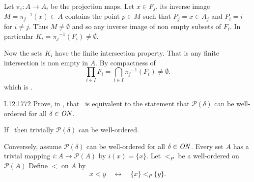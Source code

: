Let \(\pi_i: A \to A_i\) be the projection maps.
Let \(x \in F_j\), its inverse image \(M = {\pi_j}^{-1}(x) \subset A\)
contains the point \(p\in M\)
such that \(P_j = x \in A_j\) and \(P_i = i\) for \(i \neq j\).
Thus \(M\neq \emptyset\) and so any inverse image of non empty
subsets of \(F_i\). In particular \(K_i = {\pi_j}^{-1}(F_i) \neq \emptyset\).

Now the sets \(K_i\) have the finite intersection property.
That is any finite intersection is non empty in $A$.
By compactness of
\begin{equation*}
\prod_{i\in I} F_i = \bigcap_{i\in I} {\pi_j}^{-1}(F_i) \neq \emptyset.
\end{equation*}
which is \AC.

\begin{lexcopy}{I.12.17}{72}
Prove, in \ZF, that \AC\ is equivalent to the statement that
\(\mathcal{P}(\delta)\) can be well-ordered
for all \(\delta \in \mathit{ON}\).
\end{lexcopy}
If \AC\ then trivially \(\mathcal{P}(\delta)\) can be well-ordered.

Conversely, assume \(\mathcal{P}(\delta)\) can be well-ordered
for all \(\delta \in \mathit{ON}\).
Every set $A$ has a trivial mapping \(i: A \to \mathcal{P}(A)\)
by \(i(x) = \{x\}\).
Let \(<_P\) be a well-ordered on \(\mathcal{P}(A)\)
Define \(<\) on $A$ by
\begin{equation*}
x < y \quad \leftrightarrow \quad \{x\} <_P \{y\}.
\end{equation*}

